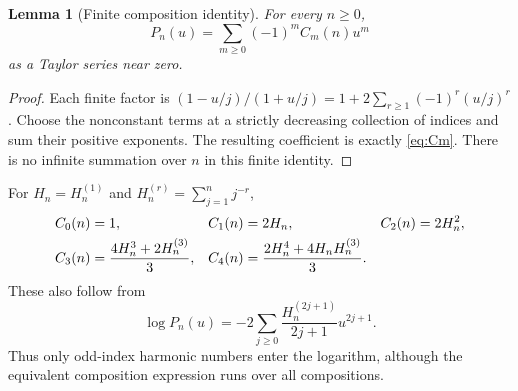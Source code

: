 \documentclass[11pt,a4paper]{article}
\numberwithin{equation}{section}
\newtheorem{lemma}[theorem]{Lemma}
\theoremstyle{definition}\newtheorem{definition}[theorem]{Definition}
\theoremstyle{remark}\newtheorem{remark}[theorem]{Remark}
\begin{document}
\begin{lemma}[Finite composition identity]
\label{lem:composition}
For every $n\ge0$,
\begin{equation}
 P_n(u)=\sum_{m\ge0}(-1)^m C_m(n)u^m
 \label{eq:P-composition}
\end{equation}
as a Taylor series near zero.
\end{lemma}
\begin{proof}
Each finite factor is
$(1-u/j)/(1+u/j)=1+2\sum_{r\ge1}(-1)^r(u/j)^r$.
Choose the nonconstant terms at a strictly decreasing collection of
indices and sum their positive exponents. The resulting coefficient
is exactly \eqref{eq:Cm}. There is no infinite summation over $n$
in this finite identity.
\end{proof}

For $H_n=H_n^{(1)}$ and $H_n^{(r)}=\sum_{j=1}^n j^{-r}$,
\begin{align}
 C_0(n)&=1,& C_1(n)&=2H_n,& C_2(n)&=2H_n^2,\notag\\
 C_3(n)&=\frac{4H_n^3+2H_n^{(3)}}3,&
 C_4(n)&=\frac{2H_n^4+4H_nH_n^{(3)}}3.
 \label{eq:low-C}
\end{align}
These also follow from
\begin{equation}
 \log P_n(u)=-2\sum_{j\ge0}\frac{H_n^{(2j+1)}}{2j+1}u^{2j+1}.
 \label{eq:log-Pn}
\end{equation}
Thus only odd-index harmonic numbers enter the logarithm, although
the equivalent composition expression runs over all compositions.
\end{document}
